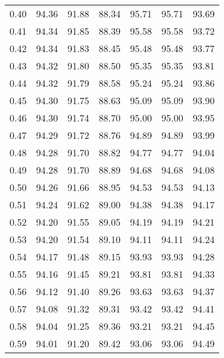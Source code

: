 \begin{tabular}{|c|c|c|c|c|c|c|}
      0.40 &     94.36 &     91.88 &      88.34 &   95.71 &      95.71 &         93.69 \\
      0.41 &     94.34 &     91.85 &      88.39 &   95.58 &      95.58 &         93.72 \\
      0.42 &     94.34 &     91.83 &      88.45 &   95.48 &      95.48 &         93.77 \\
      0.43 &     94.32 &     91.80 &      88.50 &   95.35 &      95.35 &         93.81 \\
      0.44 &     94.32 &     91.79 &      88.58 &   95.24 &      95.24 &         93.86 \\
      0.45 &     94.30 &     91.75 &      88.63 &   95.09 &      95.09 &         93.90 \\
      0.46 &     94.30 &     91.74 &      88.70 &   95.00 &      95.00 &         93.95 \\
      0.47 &     94.29 &     91.72 &      88.76 &   94.89 &      94.89 &         93.99 \\
      0.48 &     94.28 &     91.70 &      88.82 &   94.77 &      94.77 &         94.04 \\
      0.49 &     94.28 &     91.70 &      88.89 &   94.68 &      94.68 &         94.08 \\
      0.50 &     94.26 &     91.66 &      88.95 &   94.53 &      94.53 &         94.13 \\
      0.51 &     94.24 &     91.62 &      89.00 &   94.38 &      94.38 &         94.17 \\
      0.52 &     94.20 &     91.55 &      89.05 &   94.19 &      94.19 &         94.21 \\
      0.53 &     94.20 &     91.54 &      89.10 &   94.11 &      94.11 &         94.24 \\
      0.54 &     94.17 &     91.48 &      89.15 &   93.93 &      93.93 &         94.28 \\
      0.55 &     94.16 &     91.45 &      89.21 &   93.81 &      93.81 &         94.33 \\
      0.56 &     94.12 &     91.40 &      89.26 &   93.63 &      93.63 &         94.37 \\
      0.57 &     94.08 &     91.32 &      89.31 &   93.42 &      93.42 &         94.41 \\
      0.58 &     94.04 &     91.25 &      89.36 &   93.21 &      93.21 &         94.45 \\
      0.59 &     94.01 &     91.20 &      89.42 &   93.06 &      93.06 &         94.49 \\

\end{tabular}
